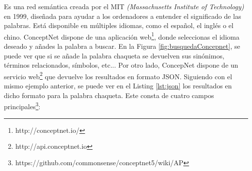 Es una red semántica creada por el MIT \textit{(Massachusetts Institute of Technology)} en 1999, diseñada para ayudar a los ordenadores a entender el significado de las palabras. Está disponible en múltiples idiomas, como el español, el inglés o el chino. ConceptNet dispone de una aplicación web\footnote{http://conceptnet.io/}, donde seleccionas el idioma deseado y añades la palabra a buscar. En la Figura  \ref{fig:busquedaConcepnet}, se puede ver que si se añade la palabra chaqueta se devuelven sus sinónimos, términos relacionados, símbolos, etc...
Por otro lado, ConcepNet dispone de un servicio web\footnote{http://api.conceptnet.io} que devuelve los resultados en formato JSON. Siguiendo con el mismo ejemplo anterior, se puede ver en el Listing \ref{lst:json} los resultados en dicho formato para la palabra chaqueta. Este consta de cuatro campos principales\footnote{https://github.com/commonsense/conceptnet5/wiki/AP}:
